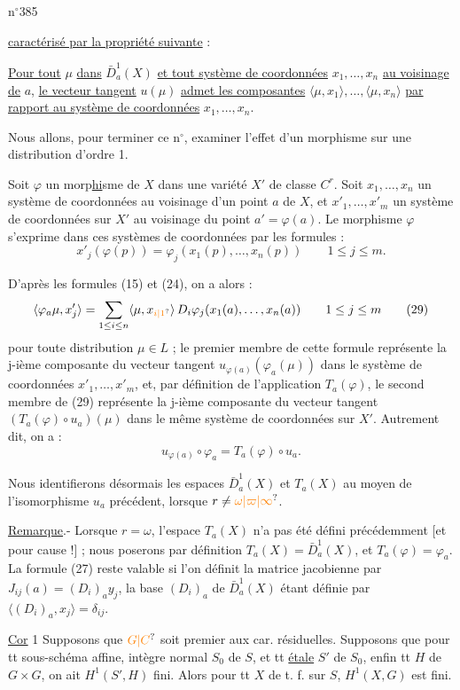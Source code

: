 n$^{\circ}$385

\uline{caractérisé par la propriété suivante} :

\uline{Pour tout} $\mu$ \uline{dans} $\bar D_a^1(X)$ \uline{et tout système de coordonnées} $x_1,\ldots,x_n$ \uline{au voisinage de} $a$, \uline{le vecteur tangent} $u(\mu)$ \uline{admet les composantes} $\langle\mu,x_1\rangle,\ldots,\langle\mu,x_n\rangle$ \uline{par rapport au système de coordonnées} $x_1,\ldots,x_n$.

Nous allons, pour terminer ce n$^{\circ}$, examiner l'effet d'un morphisme sur une distribution d'ordre 1.

Soit $\varphi$ un morp\uline{hi}sme de $X$ dans une variété $X'$ de classe $C^r$. Soit $x_1,\ldots,x_n$ un système de coordonnées au voisinage d'un point $a$ de $X$, et $x'_1,\ldots,x'_m$ un système de coordonnées sur $X'$ au voisinage du point $a'=\varphi(a)$. Le morphisme $\varphi$ s'exprime dans ces systèmes de coordonnées par les formules :
\[
x'_j(\varphi(p))=\varphi_j(x_1(p),\ldots,x_n(p))\qquad 1\leq j\leq m.\tag*{(28)}
\]

D'après les formules (15) et (24), on a alors :
\[
\langle\varphi_a\mu,x'_j\rangle=\sum_{1\leq i\leq n}\langle\mu,x_{\unsure{i|1}}\rangle\,D_i\varphi_j(x_1(a),\ldots,x_n(a))\qquad 1\leq j\leq m\tag*{(29)}
\]
pour toute distribution $\mu\in L$ ; le premier membre de cette formule représente la j-ième composante du vecteur tangent $u_{\varphi(a)}(\varphi_a(\mu))$ dans le système de coordonnées $x'_1,\ldots,x'_m$, et, par définition de l'application $T_a(\varphi)$, le second membre de (29) représente la j-ième composante du vecteur tangent $(T_a(\varphi)\circ u_a)(\mu)$ dans le même système de coordonnées sur $X'$. Autrement dit, on a :
\[
u_{\varphi(a)}\circ\varphi_a=T_a(\varphi)\circ u_a.\tag*{(30)}
\]

Nous identifierons désormais les espaces $\bar D_a^1(X)$ et $T_a(X)$ au moyen de l'isomorphisme $u_a$ précédent, lorsque $r\ne\unsure{\omega|\varpi|\infty}$.

\uline{Remarque}.- Lorsque $r=\omega$, l'espace $T_a(X)$ n'a pas été défini précédemment [et pour cause !] ; nous poserons par définition $T_a(X)=\bar D_a^1(X)$, et $T_a(\varphi)=\varphi_a$. La formule (27) reste valable si l'on définit la matrice jacobienne par $J_{ij}(a)=(D_i)_a y_j$, la base $(D_i)_a$ de $\bar D_a^1(X)$ étant définie par $\langle(D_i)_a,x_j\rangle=\delta_{ij}$.

\uline{Cor} 1 Supposons que $\unsure{G|C}$ soit premier aux car. résiduelles.  Supposons que pour tt sous-schéma affine, intègre normal $S_0$ de $S$, et tt \uline{} \uline{étale}  $S'$ de $S_0$, enfin tt  $H$ de $G\times G$, on ait $H^1(S',H)$ fini. Alors pour tt $X$ de t. f. sur $S$, $H^1(X,G)$ est fini.

